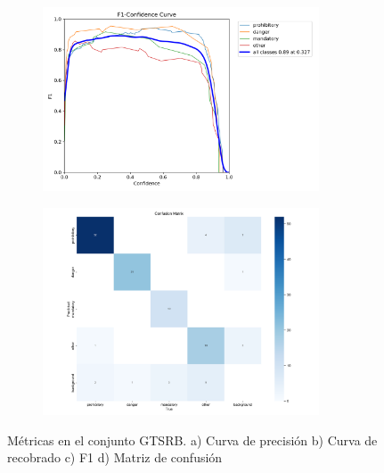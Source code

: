 \documentclass{article}
\begin{document}
\begin{figure}[h]
\begin{subfigure}[b]{0.5\textwidth}
\caption{}
\end{subfigure}
\begin{subfigure}[b]{0.5\textwidth}
\centering
\includegraphics[width=0.9\textwidth]{resources/general in general F1 curve.png}
\caption{}
\end{subfigure}
\begin{subfigure}[b]{0.5\textwidth}
\centering
\includegraphics[width=0.9\textwidth]{resources/general in general confusion matrix.png}
\caption{}
\end{subfigure}
\caption{Métricas en el conjunto GTSRB. a) Curva de precisión b) Curva de recobrado c) F1 d) Matriz de confusión}
\label{fig:results in general}
\end{figure}
\end{document}
